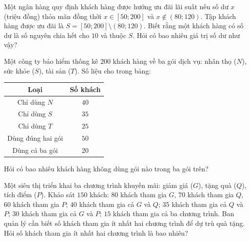\begin{bt}%
	Một ngân hàng quy định khách hàng được hưởng ưu đãi lãi suất nếu số dư $x$ (triệu đồng) thỏa mãn đồng thời $x\in[50;200]$ và $x\notin(80;120)$. Tập khách hàng được ưu đãi là $S=[50;200]\setminus(80;120)$. Biết rằng một khách hàng có số dư là số nguyên chia hết cho $10$ và thuộc $S$. Hỏi có bao nhiêu giá trị số dư như vậy?
	
\end{bt}

\begin{bt}%
	Một công ty bảo hiểm thống kê $200$ khách hàng về ba gói dịch vụ: nhân thọ ($N$), sức khỏe ($S$), tài sản ($T$). Số liệu cho trong bảng:
	\begin{center}
		\begin{tabular}{|c|c|}
			\hline
			Loại & Số khách \\
			\hline
			Chỉ dùng $N$ & $40$ \\
			Chỉ dùng $S$ & $35$ \\
			Chỉ dùng $T$ & $25$ \\
			Dùng đúng hai gói & $50$ \\
			Dùng cả ba gói & $20$ \\
			\hline
		\end{tabular}
	\end{center}
	Hỏi có bao nhiêu khách hàng không dùng gói nào trong ba gói trên?
	
\end{bt}

\begin{bt}%
	Một siêu thị triển khai ba chương trình khuyến mãi: giảm giá ($G$), tặng quà ($Q$), tích điểm ($P$). Khảo sát $150$ khách: $80$ khách tham gia $G$, $70$ khách tham gia $Q$, $60$ khách tham gia $P$; $40$ khách tham gia cả $G$ và $Q$; $35$ khách tham gia cả $Q$ và $P$; $30$ khách tham gia cả $G$ và $P$; $15$ khách tham gia cả ba chương trình. Ban quản lý cần biết số khách tham gia ít nhất hai chương trình để dự trù quà tặng. Hỏi số khách tham gia ít nhất hai chương trình là bao nhiêu?
	
\end{bt}


